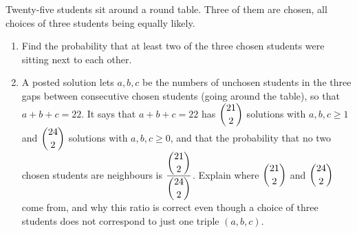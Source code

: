 Twenty-five students sit around a round table. Three of them are chosen, all choices of three students being equally likely.
\begin{enumerate}
\item[(a)] Find the probability that at least two of the three chosen students were sitting next to each other.
\item[(b)] A posted solution lets $a,b,c$ be the numbers of unchosen students in the three gaps between consecutive chosen students (going around the table), so that $a+b+c=22$. It says that $a+b+c=22$ has $\dbinom{21}{2}$ solutions with $a,b,c\ge1$ and $\dbinom{24}{2}$ solutions with $a,b,c\ge0$, and that the probability that no two chosen students are neighbours is $\dfrac{\dbinom{21}{2}}{\dbinom{24}{2}}$. Explain where $\dbinom{21}{2}$ and $\dbinom{24}{2}$ come from, and why this ratio is correct even though a choice of three students does not correspond to just one triple $(a,b,c)$.
\end{enumerate}

